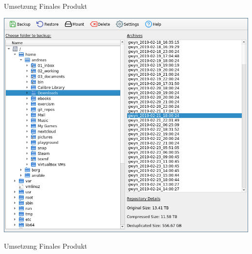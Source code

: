 \documentclass[12pt, aspectratio=1610]{beamer}
\begin{document}
\begin{frame}[label={sec:org48329e5}]{Umsetzung}
\alert{Finales Produkt}

\begin{center}
\includegraphics[height=.8\textheight]{pictures/borgqt1.png}%
\end{center}
\end{frame}

\begin{frame}[label={sec:org0b5d022}]{Umsetzung}
\alert{Finales Produkt}

\begin{center}
%
\end{center}
\end{frame}
\end{document}
